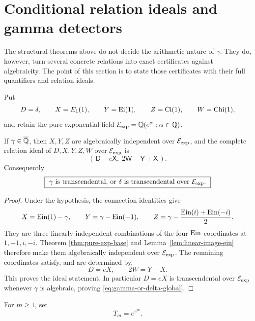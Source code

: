 \section{Conditional relation ideals and gamma detectors}
\label{sec:gamma-detectors}

The structural theorems above do not decide the arithmetic nature of
\(\gamma\).  They do, however, turn several concrete relations into exact
certificates against algebraicity.  The point of this section is to state
those certificates with their full quantifiers and relation ideals.

Put
\[
 D=\delta,\qquad X=E_1(1),\qquad Y=\operatorname{Ei}(1),\qquad
 Z=\operatorname{Ci}(1),\qquad W=\operatorname{Chi}(1),
\]
and retain the pure exponential field
\(\mathcal E_{\mathrm{exp}}=\overline{\mathbb Q}(e^\alpha:\alpha\in\overline{\mathbb Q})\).

\begin{proposition}
\label{prop:conditional-pure-exp-ideal}
If \(\gamma\in\overline{\mathbb Q}\), then \(X,Y,Z\) are algebraically independent over
\(\mathcal E_{\mathrm{exp}}\), and the complete relation ideal of \(D,X,Y,Z,W\) over
\(\mathcal E_{\mathrm{exp}}\) is
\begin{equation}\label{eq:conditional-pure-exp-ideal}
 (\,\mathsf D-e\mathsf X,\;2\mathsf W-\mathsf Y+\mathsf X\,).
\end{equation}
Consequently
\begin{equation}\label{eq:gamma-or-delta-global}
 \boxed{\ \gamma\text{ is transcendental, or }
 \delta\text{ is transcendental over }\mathcal E_{\mathrm{exp}}.\ }
\end{equation}
\end{proposition}

\begin{proof}
Under the hypothesis, the connection identities give
\[
 X=\operatorname{Ein}(1)-\gamma,\qquad
 Y=\gamma-\operatorname{Ein}(-1),\qquad
 Z=\gamma-\frac{\operatorname{Ein}(i)+\operatorname{Ein}(-i)}2.
\]
They are three linearly independent combinations of the four
\(\operatorname{Ein}\)-coordinates at \(1,-1,i,-i\).  Theorem
\ref{thm:pure-exp-base} and Lemma~\ref{lem:linear-image-ein} therefore make
them algebraically independent over \(\mathcal E_{\mathrm{exp}}\).  The remaining coordinates
satisfy, and are determined by,
\[
 D=eX,\qquad 2W=Y-X.
\]
This proves the ideal statement.  In particular \(D=eX\) is transcendental
over \(\mathcal E_{\mathrm{exp}}\) whenever \(\gamma\) is algebraic, proving
\eqref{eq:gamma-or-delta-global}.
\end{proof}

For \(m\ge1\), set
\[
 T_m=e^{\gamma^m}.
\]

